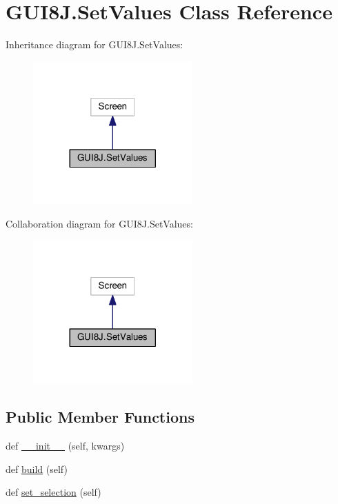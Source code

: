 \hypertarget{classGUI8J_1_1SetValues}{}\section{G\+U\+I8\+J.\+Set\+Values Class Reference}
\label{classGUI8J_1_1SetValues}


Inheritance diagram for G\+U\+I8\+J.\+Set\+Values\+:\nopagebreak
\begin{figure}[H]
\begin{center}
\leavevmode
\includegraphics[width=173pt]{classGUI8J_1_1SetValues__inherit__graph}
\end{center}
\end{figure}


Collaboration diagram for G\+U\+I8\+J.\+Set\+Values\+:\nopagebreak
\begin{figure}[H]
\begin{center}
\leavevmode
\includegraphics[width=173pt]{classGUI8J_1_1SetValues__coll__graph}
\end{center}
\end{figure}
\subsection*{Public Member Functions}
\begin{DoxyCompactItemize}
\item 
def \hyperlink{classGUI8J_1_1SetValues_a50aecbed585d5eb0dd5d48e810b89303}{\+\_\+\+\_\+init\+\_\+\+\_\+} (self, kwargs)
\item 
def \hyperlink{classGUI8J_1_1SetValues_ac327a506ed4ef380a0e6cffdc7125a94}{build} (self)
\item 
def \hyperlink{classGUI8J_1_1SetValues_ad395153098290dc55aa98bb3cbe15a44}{set\+\_\+selection} (self)
\end{DoxyCompactItemize}
